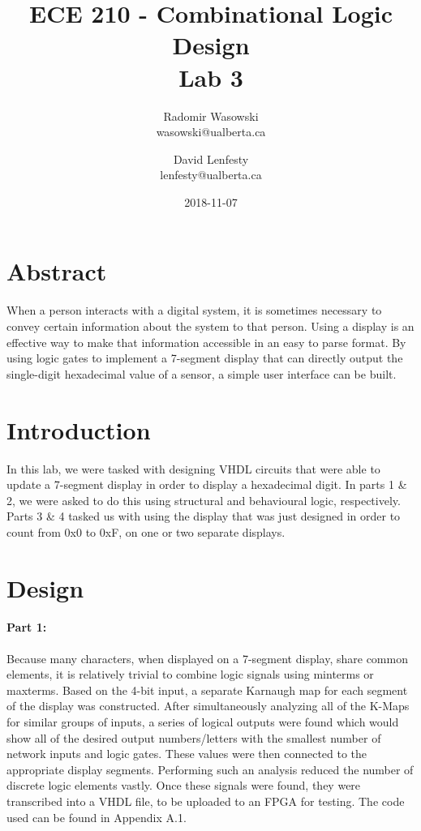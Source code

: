 \documentclass{article}
\title{ECE 210 - Combinational Logic Design \\ Lab 3}
\date{2018-11-07}
\author{Radomir Wasowski \\ wasowski@ualberta.ca
        \and David Lenfesty \\ lenfesty@ualberta.ca}
\begin{document}
\doublespacing
\maketitle
\newpage

\singlespacing

\section{Abstract}

When a person interacts with a digital system, it is sometimes necessary to convey certain information about the system to that person. Using a display is an effective way to make that information accessible in an easy to parse format.
By using logic gates to implement a 7-segment display that can directly output the single-digit hexadecimal value of a sensor,
a simple user interface can be built.

\section{Introduction}

In this lab, we were tasked with designing VHDL circuits that were able to update a 7-segment display
in order to display a hexadecimal digit.
In parts 1 \& 2, we were asked to do this using structural and behavioural logic, respectively.
Parts 3 \& 4 tasked us with using the display that was just designed in order to count from 0x0 to 0xF, on one or two separate displays.

\section{Design}

\paragraph{Part 1:}

Because many characters, when displayed on a 7-segment display, share common elements,
it is relatively trivial to combine logic signals using minterms or maxterms.
Based on the 4-bit input, a separate Karnaugh map for each segment of the display was constructed. After simultaneously analyzing all of the K-Maps for similar groups of inputs, a series of logical outputs
were found which would show all of the  desired output numbers/letters with the smallest number of network inputs and logic gates. These values were then connected to the appropriate display segments.
Performing such an analysis reduced the number of discrete logic elements vastly.
Once these signals were found, they were transcribed into a VHDL file,
to be uploaded to an FPGA for testing. The code used can be found in Appendix A.1.
\end{document}
